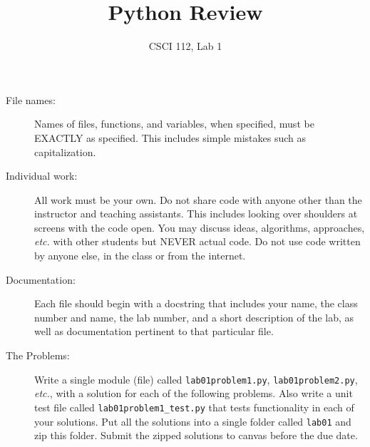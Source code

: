 \documentclass{article}
\title{Python Review}
\author{CSCI 112, Lab 1}
\date{}
\begin{document}
\sloppy

\maketitle

\begin{description} 
\item[File names:]  Names of files, functions, and variables, 
when specified,
must be EXACTLY as specified.  This includes simple mistakes such
as capitalization.

\item[Individual work:]  All work must be your own.  Do not share
code with anyone other than the instructor and teaching assistants.
This includes looking over shoulders at screens with the code open.
You may discuss ideas, algorithms, approaches, {\em etc.} with
other students but NEVER actual code.  Do not use code
written by anyone else, in the class or from the internet.

\item[Documentation:] Each file should begin with a docstring
that includes your name, the class number and name, the lab
number, and  
a short description of the lab, as well as documentation pertinent
to that particular file.

\item[The Problems:]  Write a single module (file) called {\tt lab01problem1.py},
{\tt lab01problem2.py}, {\em etc.},
with a solution for each of the following problems.  Also write a unit test
file called {\tt lab01problem1\_test.py} that tests functionality in each of your solutions.
Put all the solutions into a single folder called {\tt lab01} and zip this folder.
Submit the zipped solutions to canvas before the due date.

\end{description}
\end{document}
